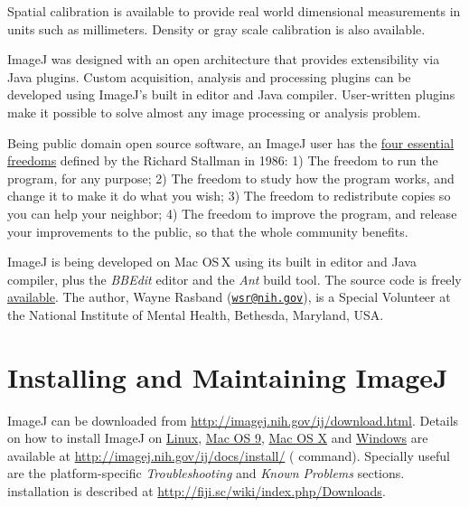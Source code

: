 Spatial calibration is available to provide real world dimensional
measurements in units such as millimeters. Density or gray scale calibration
is also available.

ImageJ was designed with an open architecture that provides extensibility
via Java plugins. Custom acquisition, analysis and processing plugins
can be developed using ImageJ's built in editor and Java compiler.
User-written plugins make it possible to solve almost any image processing
or analysis problem.

Being public domain open source software, an ImageJ user has the \href{http://wikieducator.org/The_right_license/The_essential_freedoms}{four essential freedoms}
defined by the Richard Stallman in 1986: 1) The freedom to run the
program, for any purpose; 2) The freedom to study how the program
works, and change it to make it do what you wish; 3) The freedom to
redistribute copies so you can help your neighbor; 4) The freedom
to improve the program, and release your improvements to the public,
so that the whole community benefits.

ImageJ is being developed on Mac OS\,X using its built in editor
and Java compiler, plus the \emph{BBEdit} editor and the \emph{Ant}
build tool. The source code is freely \href{http://imagej.nih.gov/ij/developer/source/index.html}{available}.
The author, Wayne Rasband (\href{mailto:wsr@nih.gov}{\nolinkurl{wsr@nih.gov}}),
is a Special Volunteer at the National Institute of Mental Health,
Bethesda, Maryland, USA.




\section{Installing and Maintaining ImageJ\label{sec:Updating-ImageJ}}

ImageJ can be downloaded from \url{http://imagej.nih.gov/ij/download.html}.
Details on how to install ImageJ on \href{http://imagej.nih.gov/ij/docs/install/linux.html}{Linux},
\href{http://imagej.nih.gov/ij/docs/install/mac.html}{Mac OS 9},
\href{http://imagej.nih.gov/ij/docs/install/osx.html}{Mac OS X}
and \href{http://imagej.nih.gov/ij/docs/install/windows.html}{Windows}
\cite{C-WindowsInstaller} are available at \url{http://imagej.nih.gov/ij/docs/install/}
(\textsf{}
command). Specially useful are the platform-specific \emph{Troubleshooting}
and \emph{Known Problems }sections. 
installation is described at \url{http://fiji.sc/wiki/index.php/Downloads}.


